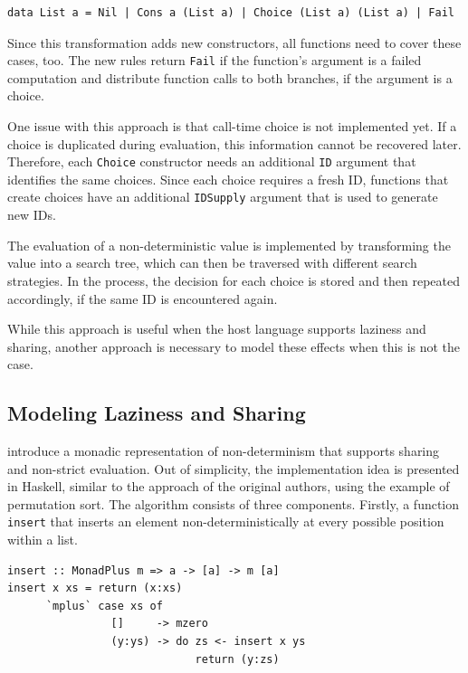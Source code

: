\documentclass[a4paper, 11pt, fleqn, twoside]{scrreprt}
\newcommand{\hinl}[1]{\texttt{#1}}
\begin{document}
\begin{verbatim}
data List a = Nil | Cons a (List a) | Choice (List a) (List a) | Fail
\end{verbatim}

Since this transformation adds new constructors, all functions need to cover these cases, too.
The new rules return \hinl{Fail} if the function's argument is a failed computation and distribute function calls to both branches, if the argument is a choice.

One issue with this approach is that call-time choice is not implemented yet.
If a choice is duplicated during evaluation, this information cannot be recovered later.
Therefore, each \hinl{Choice} constructor needs an additional \hinl{ID} argument that identifies the same choices.
Since each choice requires a fresh ID, functions that create choices have an additional \hinl{IDSupply} argument that is used to generate new IDs.

The evaluation of a non-deterministic value is implemented by transforming the value into a search tree, which can then be traversed with different search strategies.
In the process, the decision for each choice is stored and then repeated accordingly, if the same ID is encountered again.

While this approach is useful when the host language supports laziness and sharing, another approach is necessary to model these effects when this is not the case.

\subsection{Modeling Laziness and Sharing}
\label{subsec:monadicLifting}
\citet{fischer2009purely} introduce a monadic representation of non-determinism that supports sharing and non-strict evaluation.
Out of simplicity, the implementation idea is presented in Haskell, similar to the approach of the original authors, using the example of permutation sort.
The algorithm consists  of three components.
Firstly, a function \hinl{insert} that inserts an element non-deterministically at every possible position within a list.

\begin{verbatim}
insert :: MonadPlus m => a -> [a] -> m [a]
insert x xs = return (x:xs)
      `mplus` case xs of
                []     -> mzero
                (y:ys) -> do zs <- insert x ys
                             return (y:zs)
\end{verbatim}
\end{document}
